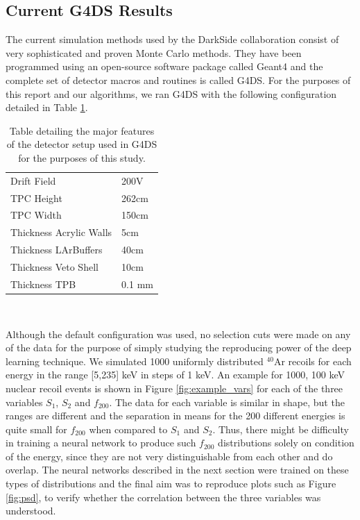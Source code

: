 \documentclass[11pt]{article} %
\begin{document}
\subsection{Current G4DS Results}
The current simulation methods used by the DarkSide collaboration consist of very sophisticated and proven Monte Carlo methods.
They have been programmed using an open-source software package called Geant4 \cite{G4} and the complete set of detector macros and routines is called G4DS.
For the purposes of this report and our algorithms, we ran G4DS with the following configuration detailed in Table \ref{table:g4ds_config}.
\begin{table}[!th]
\centering
\begin{tabular}{l|l}
\hline
Drift Field & 200V \\
TPC Height & 262cm \\
TPC Width & 150cm \\
Thickness Acrylic Walls & 5cm \\
Thickness LArBuffers & 40cm \\
Thickness Veto Shell & 10cm \\
Thickness TPB & 0.1 mm \\
\hline
\end{tabular}
\caption{Table detailing the major features of the detector setup used in G4DS for the purposes of this study.}
\label{table:g4ds_config}
\end{table}
\\
\par Although the default configuration was used, no selection cuts were made on any of the data for the purpose of simply studying the reproducing power of the deep learning technique.
We simulated 1000 uniformly distributed $^{40}\mathrm{\text{Ar}}$ recoils for each energy in the range [5,235] keV in steps of 1 keV.
An example for 1000, 100 keV nuclear recoil events is shown in Figure \ref{fig:example_vars} for each of the three variables $S_1$, $S_2$ and $f_{200}$.
The data for each variable is similar in shape, but the ranges are different and the separation in means for the 200 different energies is quite small for $f_{200}$
when compared to $S_1$ and $S_2$.
Thus, there might be difficulty in training a neural network to produce such $f_{200}$ distributions
 solely on condition of the energy, since they are not very distinguishable from each other and do overlap.
The neural networks described in the next section were trained on these types of distributions and the final aim was to reproduce
plots such as Figure \ref{fig:psd}, to verify whether the correlation between the three variables was understood.
\end{document}
